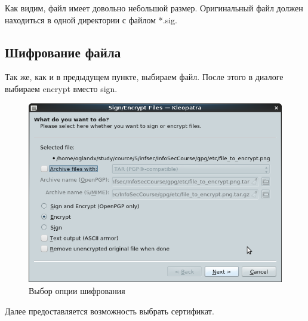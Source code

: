 \documentclass[a4paper]{article}
\begin{document}
Как видим, файл имеет довольно небольшой размер. Оригинальный файл должен находиться в одной директории с файлом *.sig.

\subsection{Шифрование файла}

Так же, как и в предыдущем пункте, выбираем файл. После этого в диалоге выбираем encrypt вместо sign.

\begin{figure}[H]
	\begin{center}
		\includegraphics[scale=0.5]{pics/Screenshot at 2016-04-18 00:56:45.png}
		\caption{Выбор опции шифрования} 
		\label{pic:pic_name} %
	\end{center}
\end{figure}

Далее предоставляется возможность выбрать сертификат.
\end{document}
